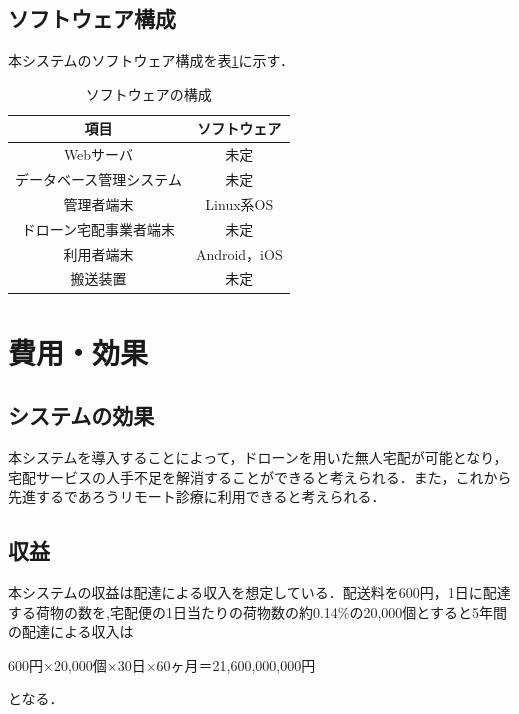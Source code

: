 \documentclass[a4paper, titlepage]{jsarticle}
\begin{document}
\subsection{ソフトウェア構成}
本システムのソフトウェア構成を表\ref{fig:software}に示す．
\begin{table}[H]
 \begin{center}
  \caption{ソフトウェアの構成}
    \label{fig:software}
  \begin{tabular}{cc} \hline
    項目 & ソフトウェア \\ \hline \hline
    Webサーバ & 未定 \\
    データベース管理システム & 未定 \\
    管理者端末 & Linux系OS \\
    ドローン宅配事業者端末 & 未定 \\
    利用者端末 & Android，iOS \\
    搬送装置 & 未定 \\ \hline
  \end{tabular}
 \end{center}
\end{table}

\section{費用・効果}
\subsection{システムの効果}
本システムを導入することによって，ドローンを用いた無人宅配が可能となり，宅配サービスの人手不足を解消することができると考えられる．また，これから先進するであろうリモート診療に利用できると考えられる．

\subsection{収益}
本システムの収益は配達による収入を想定している．配送料を600円，1日に配達する荷物の数を,宅配便の1日当たりの荷物数の約0.14\%の20,000個とすると5年間の配達による収入は
\begin{center}
    600円×20,000個×30日×60ヶ月＝21,600,000,000円
\end{center}
となる．
\end{document}
